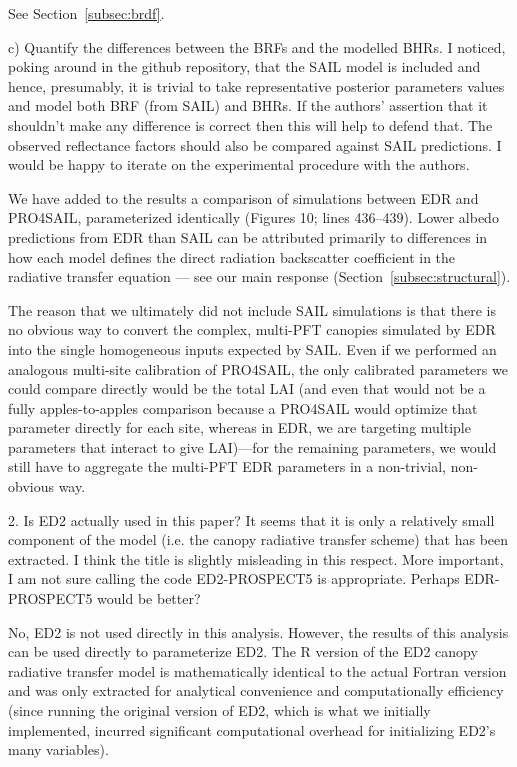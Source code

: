 See Section~\ref{subsec:brdf}.

\begin{reviewer}
  c) Quantify the differences between the BRFs and the modelled BHRs.
  I noticed, poking around in the github repository, that the SAIL model is included and hence, presumably, it is trivial to take representative posterior parameters values and model both BRF (from SAIL) and BHRs.
  If the authors’ assertion that it shouldn’t make any difference is correct then this will help to defend that.
  The observed reflectance factors should also be compared against SAIL predictions.
  I would be happy to iterate on the experimental procedure with the authors.
\end{reviewer}

We have added to the results a comparison of simulations between EDR and PRO4SAIL, parameterized identically (Figures 10; lines 436--439).
Lower albedo predictions from EDR than SAIL can be attributed primarily to differences in how each model defines the direct radiation backscatter coefficient in the radiative transfer equation --- see our main response (Section~\ref{subsec:structural}).

The reason that we ultimately did not include SAIL simulations is that there is no obvious way to convert the complex, multi-PFT canopies simulated by EDR into the single homogeneous inputs expected by SAIL.\@
Even if we performed an analogous multi-site calibration of PRO4SAIL, the only calibrated parameters we could compare directly would be the total LAI
(and even that would not be a fully apples-to-apples comparison because a PRO4SAIL would optimize that parameter directly for each site, whereas in EDR, we are targeting multiple parameters that interact to give LAI)---for the remaining parameters, we would still have to aggregate the multi-PFT EDR parameters in a non-trivial, non-obvious way.

\begin{reviewer}
  2. Is ED2 actually used in this paper? It seems that it is only a relatively small component of the model (i.e. the canopy radiative transfer scheme) that has been extracted. I think the title is slightly misleading in this respect. More important, I am not sure calling the code ED2-PROSPECT5 is appropriate. Perhaps EDR-PROSPECT5 would be better?
\end{reviewer}

No, ED2 is not used directly in this analysis.
However, the results of this analysis can be used directly to parameterize ED2.
The R version of the ED2 canopy radiative transfer model is mathematically identical to the actual Fortran version and was only extracted for analytical convenience and computationally efficiency
(since running the original version of ED2, which is what we initially implemented, incurred significant computational overhead for initializing ED2’s many variables).

